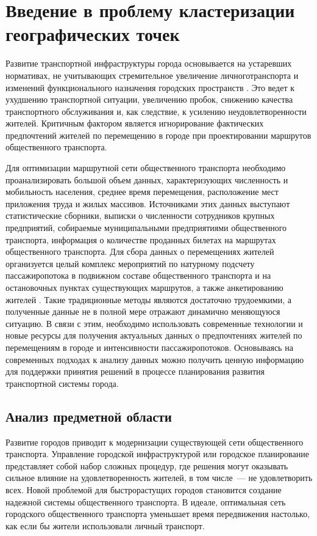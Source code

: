 \chapter{Введение в проблему кластеризации географических точек}

Развитие транспортной инфраструктуры города основывается на устаревших нормативах, не учитывающих стремительное увеличение личного\linebreak транспорта и изменений функционального назначения городских пространств \cite{bib:1}. Это ведет к ухудшению транспортной ситуации, увеличению пробок, снижению качества транспортного обслуживания и, как следствие, к усилению неудовлетворенности жителей. Критичным фактором является игнорирование фактических предпочтений жителей по перемещению в городе при проектировании маршрутов общественного транспорта.

Для оптимизации маршрутной сети общественного транспорта необходимо проанализировать большой объем данных, характеризующих численность и мобильность населения, среднее время перемещения, расположение мест приложения труда и жилых массивов. Источниками этих данных выступают статистические сборники, выписки о численности сотрудников крупных предприятий, собираемые муниципальными предприятиями общественного транспорта, информация о количестве проданных билетах на маршрутах общественного транспорта. Для сбора данных о перемещениях жителей организуется целый комплекс мероприятий по натурному подсчету пассажиропотока в подвижном составе общественного транспорта и на остановочных пунктах существующих маршрутов, а также анкетированию жителей \cite{bib:2, bib:3}. Такие традиционные методы являются достаточно трудоемкими, а полученные данные не в полной мере отражают динамично меняющуюся ситуацию. В связи с этим, необходимо использовать современные технологии и новые ресурсы для получения актуальных данных о предпочтениях жителей по перемещениям в городе и интенсивности пассажиропотоков. Основываясь на современных подходах к анализу данных можно получить ценную информацию для поддержки принятия решений в процессе планирования развития транспортной системы города.


\section{Анализ предметной области}
Развитие городов приводит к модернизации существующей сети общественного транспорта. Управление городской инфраструктурой или городское планирование представляет собой набор сложных процедур, где решения могут оказывать сильное влияние на удовлетворенность жителей, в том числе~--- не удовлетворить всех. Новой проблемой для быстрорастущих городов становится создание надежной системы общественного транспорта. В идеале, оптимальная сеть городского общественного транспорта уменьшает время передвижения настолько, как если бы жители использовали личный транспорт.

